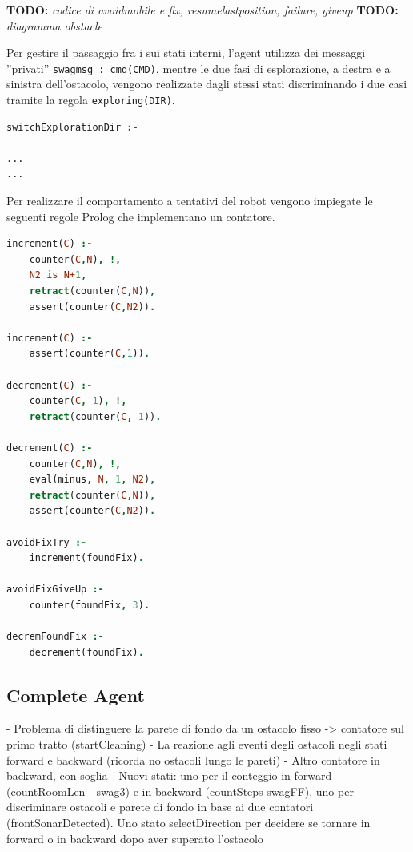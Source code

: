\documentclass{../llncs}
\newcommand{\codescript}[1]{{\mbox{\small{\texttt{#1}}}}\xspace}
\newcommand{\todo}[1]{\textbf{TODO:} \emph{#1}}
\begin{document}
\todo{codice di avoidmobile e fix, resumelastposition, failure, giveup}
\todo{diagramma obstacle}

Per gestire il passaggio fra i sui stati interni, l'agent utilizza dei messaggi ''privati'' \codescript{swagmsg : cmd(CMD)}, mentre le due fasi di esplorazione, a destra e a sinistra dell'ostacolo, vengono realizzate dagli stessi stati discriminando i due casi tramite la regola \codescript{exploring(DIR)}.

\begin{lstlisting}[language=Prolog, keywordstyle=\color{black}, caption={SoftwareAgent, Rules - pt2}]
switchExplorationDir :-

...
...
\end{lstlisting}

Per realizzare il comportamento a tentativi del robot vengono impiegate le seguenti regole Prolog che implementano un contatore.

\begin{lstlisting}[language=Prolog, keywordstyle=\color{black}, caption={SoftwareAgent, Rules - pt3}]
increment(C) :-
	counter(C,N), !,
	N2 is N+1,
	retract(counter(C,N)),
	assert(counter(C,N2)).
	
increment(C) :-
	assert(counter(C,1)).

decrement(C) :-
	counter(C, 1), !,
	retract(counter(C, 1)).

decrement(C) :-
	counter(C,N), !,
	eval(minus, N, 1, N2),
	retract(counter(C,N)),
	assert(counter(C,N2)).

avoidFixTry :-
	increment(foundFix).

avoidFixGiveUp :-
	counter(foundFix, 3).

decremFoundFix :-
	decrement(foundFix).
\end{lstlisting}

\subsection{Complete Agent}
- Problema di distinguere la parete di fondo da un ostacolo fisso -> contatore sul primo tratto (startCleaning)
- La reazione agli eventi degli ostacoli negli stati forward e backward (ricorda no ostacoli lungo le pareti)
- Altro contatore in backward, con soglia
- Nuovi stati: uno per il conteggio in forward (countRoomLen - swag3) e in backward (countSteps swagFF), uno per discriminare ostacoli e parete di fondo in base ai due contatori (frontSonarDetected). Uno stato selectDirection per decidere se tornare in forward o in backward dopo aver superato l'ostacolo
\end{document}
